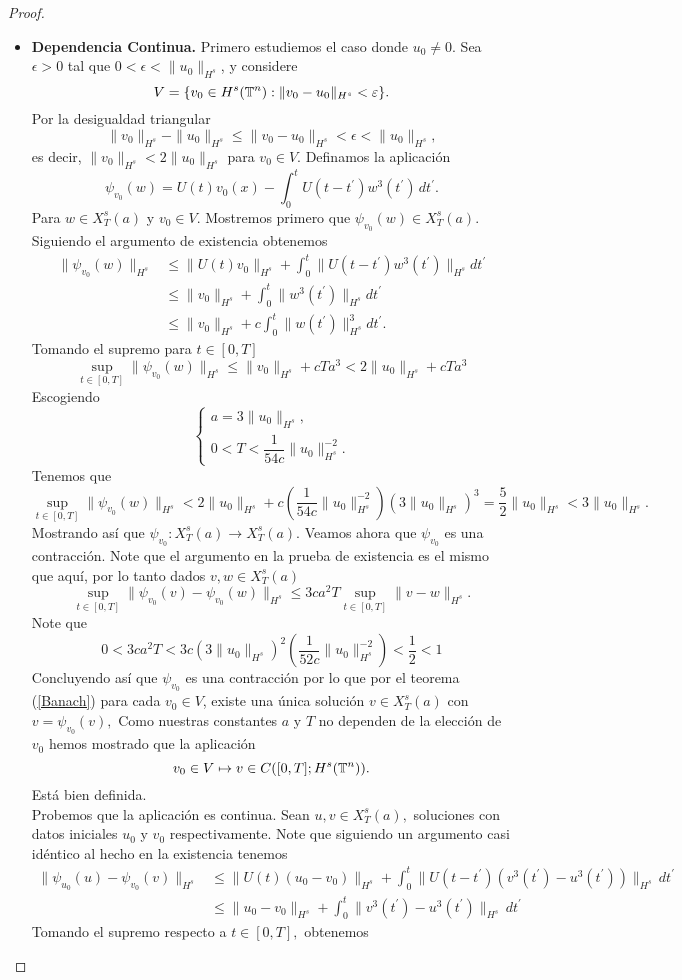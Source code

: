 \begin{proof}
\begin{itemize}
       \item \textbf{Dependencia Continua.} Primero estudiemos el caso donde $u_0\neq0.$ Sea $\epsilon>0$ tal que $0<\epsilon<\|u_0\|_{H^s}$, y considere 
       $$V=\{v_0\in H^s(\mathbb{T}^n):\|v_0-u_0\|_{H^s}<\varepsilon\}.$$
       Por la desigualdad triangular
       $$\|v_0\|_{H^s}-\|u_0\|_{H^s}\leq\|v_0-u_0\|_{H^s}<\epsilon<\|u_0\|_{H^s},$$
       es decir, $\|v_0\|_{H^s}<2\|u_0\|_{H^s}$ para $v_0\in V.$ Definamos la aplicación
       $$\psi_{v_0}(w)=U(t)v_0(x)-\int_0^tU(t-t^\prime)w^3(t^\prime)\,dt^\prime.$$
       Para $w\in X^s_T(a)$ y $v_0\in V.$ Mostremos primero que $\psi_{v_0}(w)\in X^s_T(a).$ Siguiendo el argumento de existencia obtenemos
       \begin{align*}
           \|\psi_{v_0}(w)\|_{H^s}&\leq\|U(t)v_0\|_{H^s}+\int_0^t\|U(t-t^\prime)w^3(t^\prime)\|_{H^s}dt^\prime\\
           &\leq\|v_0\|_{H^s}+\int_0^t\|w^3(t^\prime)\|_{H^s}dt^\prime\\
           &\leq\|v_0\|_{H^s}+c\int_0^t\|w(t^\prime)\|_{H^s}^3dt^\prime.
       \end{align*}
       Tomando el supremo para $t\in[0,T]$
       $$\sup_{t\in[0,T]} \|\psi_{v_0}(w)\|_{H^s}\leq \|v_0\|_{H^s}+cTa^3<2\|u_0\|_{H^s}+cTa^3$$
       Escogiendo
       $$\begin{cases}
           a=3\|u_0\|_{H^s},\\
           0<T<\dfrac{1}{54c}\|u_0\|_{H^s}^{-2}.
       \end{cases}$$
       Tenemos que
       $$\sup_{t\in[0,T]} \|\psi_{v_0}(w)\|_{H^s}<2\|u_0\|_{H^s}+c\left(\frac{1}{54c}\|u_0\|_{H^s}^{-2}\right)(3\|u_0\|_{H^s})^3=\frac{5}{2}\|u_0\|_{H^s}< 3\|u_0\|_{H^s}.$$
       Mostrando así que $\psi_{v_0}:X^s_T(a)\to X^s_T(a).$ Veamos ahora que $\psi_{v_0}$ es una contracción. Note que el argumento en la prueba de existencia es el mismo que aquí, por lo tanto dados $v,w\in X^s_T(a)$
       $$\sup_{t\in[0,T]}\|\psi_{v_0}(v)-\psi_{v_0}(w)\|_{H^s}\leq 3ca^2T\sup_{t\in[0,T]}\|v-w\|_{H^s}.$$
       Note que
       $$0<3ca^2T<3c(3\|u_0\|_{H^s})^2\left(\frac{1}{52c}\|u_0\|_{H^s}^{-2}\right)<\frac{1}{2}<1$$
       Concluyendo así que $\psi_{v_0}$ es una contracción por lo que por el teorema (\ref{Banach}) para cada $v_0\in V$, existe una única solución $v\in X^s_T(a)$ con $v=\psi_{v_0}(v),$ Como nuestras constantes $a$ y $T$ no dependen de la elección de $v_0$ hemos mostrado que la aplicación
       $$v_0\in V\mapsto v\in C([0,T];H^s(\mathbb{T}^n)).$$
       Está bien definida.\\
       Probemos que la aplicación es continua. Sean $u,v\in X^s_T(a),$ soluciones con datos iniciales $u_0$ y $v_0$ respectivamente. Note que siguiendo un argumento casi idéntico al hecho en la existencia tenemos  
       \begin{align*}
         \|\psi_{u_0}(u)-\psi_{v_0}(v)\|_{H^s}&\leq \|U(t)(u_0-v_0)\|_{H^s}+\int^t_0\|U(t-t^\prime)(v^3(t^\prime)-u^3(t^\prime))\|_{H^s}\,dt^\prime\\
         &\leq\|u_0-v_0\|_{H^s}+\int_0^t\|v^3(t^\prime)-u^3(t^\prime)\|_{H^s}\,dt^\prime
       \end{align*}
       Tomando el supremo respecto a $t\in[0,T],$ obtenemos


\end{itemize}
\end{proof}
